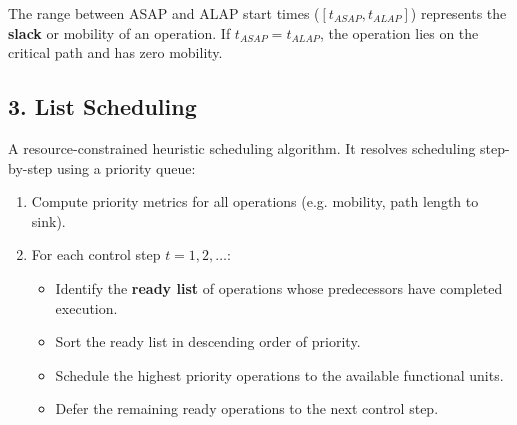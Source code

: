 \documentclass[12pt,a4paper]{article}
\begin{document}
\begin{tcolorbox}[tikzbox, title={ASAP vs. ALAP Scheduling Timelines (Latency constraint $L = 3$)}]
\begin{minipage}{0.48\linewidth}
\end{minipage}
\tcblower
The range between ASAP and ALAP start times ($[t_{ASAP}, t_{ALAP}]$) represents the \textbf{slack} or mobility of an operation. If $t_{ASAP} = t_{ALAP}$, the operation lies on the critical path and has zero mobility.
\end{tcolorbox}

\subsection{3. List Scheduling}
A resource-constrained heuristic scheduling algorithm. It resolves scheduling step-by-step using a priority queue:
\begin{enumerate}[leftmargin=*, itemsep=2pt]
  \item Compute priority metrics for all operations (e.g. mobility, path length to sink).
  \item For each control step $t = 1, 2, \dots$:
    \begin{itemize}[leftmargin=*, label=$\bullet$, itemsep=1.5pt]
      \item Identify the \textbf{ready list} of operations whose predecessors have completed execution.
      \item Sort the ready list in descending order of priority.
      \item Schedule the highest priority operations to the available functional units.
      \item Defer the remaining ready operations to the next control step.
    \end{itemize}
\end{enumerate}
\end{document}
